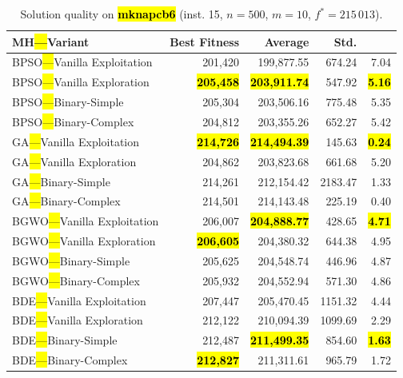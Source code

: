 \documentclass[mathematics,article,accept,moreauthors]{Definitions/mdpi}
\begin{document}
\begin{table}[H]
  \small
  \caption{Solution quality on \textbf{\hl{mknapcb6}} (inst. 15, $n=500$, $m=10$, $f^*=215\,013$).}
  \label{tab:calidad_mknapcb6_15}
  \begin{tabularx}{\textwidth}{lRRRR}
    \toprule
    \textbf{MH\hl{---}Variant} &
    \textbf{Best Fitness} &
    \textbf{Average} &
    \textbf{Std.} &
    \textbf{} \\
    \midrule
    BPSO\hl{---}Vanilla Exploitation &         201,420 &        199,877.55 & 674.24 &         7.04 \\
    BPSO\hl{---}Vanilla Exploration  & \textbf{\hl{205,458}} & \textbf{\hl{203,911.74}} & 547.92 & \textbf{\hl{5.16}} \\
    BPSO\hl{---}Binary-Simple        &         205,304 &        203,506.16 & 775.48 &         5.35 \\
    BPSO\hl{---}Binary-Complex       &         204,812 &        203,355.26 & 652.27 &         5.42 \\
    \midrule
    GA\hl{---}Vanilla Exploitation   & \textbf{\hl{214,726}} & \textbf{\hl{214,494.39}} & 145.63 & \textbf{\hl{0.24}} \\
    GA\hl{---}Vanilla Exploration    &         204,862 &        203,823.68 & 661.68 &         5.20 \\
    GA\hl{---}Binary-Simple          &         214,261 &        212,154.42 & 2183.47 &         1.33 \\
    GA\hl{---}Binary-Complex         &         214,501 &        214,143.48 & 225.19 &         0.40 \\
    \midrule
    BGWO\hl{---}Vanilla Exploitation &         206,007 & \textbf{\hl{204,888.77}} & 428.65 & \textbf{\hl{4.71}} \\
    BGWO\hl{---}Vanilla Exploration  & \textbf{\hl{206,605}} &        204,380.32 & 644.38 &         4.95 \\
    BGWO\hl{---}Binary-Simple        &         205,625 &        204,548.74 & 446.96 &         4.87 \\
    BGWO\hl{---}Binary-Complex       &         205,932 &        204,552.94 & 571.30 &         4.86 \\
    \midrule
    BDE\hl{---}Vanilla Exploitation  &         207,447 &        205,470.45 & 1151.32 &         4.44 \\
    BDE\hl{---}Vanilla Exploration   &         212,122 &        210,094.39 & 1099.69 &         2.29 \\
    BDE\hl{---}Binary-Simple         &         212,487 & \textbf{\hl{211,499.35}} & 854.60 & \textbf{\hl{1.63}} \\
    BDE\hl{---}Binary-Complex        & \textbf{\hl{212,827}} &        211,311.61 & 965.79 &         1.72 \\
    \bottomrule
  \end{tabularx}
\end{table}
\end{document}
